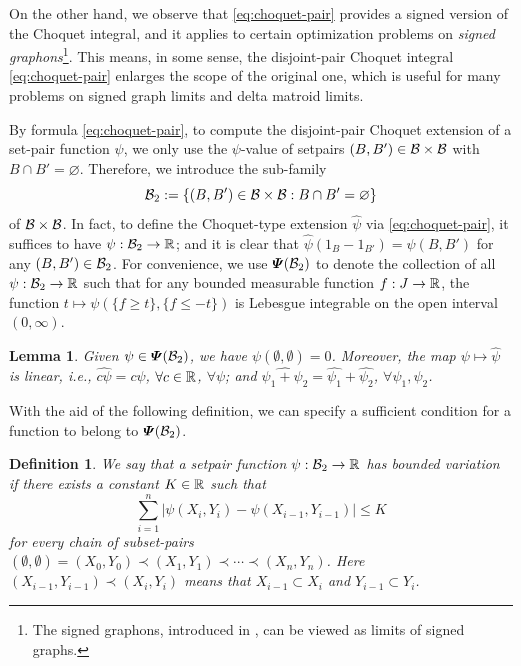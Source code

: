 \documentclass[12pt,a4paper]{article}
\newtheorem{lemma}[theorem]{Lemma}
\newtheorem{defn}[theorem]{Definition}
\begin{document}
On the other hand, we observe that \eqref{eq:choquet-pair} provides a signed version of the Choquet integral, and it applies to certain optimization problems on \emph{signed graphons}\footnote{The signed graphons, introduced in \cite{Lovasz-signed}, can be viewed as limits of signed graphs.}.  
This means, in some sense, the disjoint-pair Choquet integral  \eqref{eq:choquet-pair} enlarges the scope of the original one, which is useful for  
many problems on  signed graph limits and delta matroid limits. 

By formula \eqref{eq:choquet-pair}, to compute the disjoint-pair Choquet extension of a set-pair function $\psi$, we only use the $\psi$-value of setpairs $(B,B')\in \mathcal{B}\times \mathcal{B}$ with $B\cap B'=\varnothing$. Therefore, we introduce the sub-family $$\mathcal{B}_2:=\{(B,B')\in \mathcal{B}\times \mathcal{B}:B\cap B'=\varnothing\}$$ of $\mathcal{B}\times \mathcal{B}$. In fact, to define the Choquet-type extension $\widehat{\psi}$ via \eqref{eq:choquet-pair}, it suffices to have $\psi:\mathcal{B}_2\to\mathbb{R}$; and it is clear that $\widehat{\psi}(1_B-1_{B'})=\psi(B,B')$ for any $(B,B')\in\mathcal{B}_2$. For convenience, we use $\bm{\varPsi}(\mathcal{B}_2)$ to denote the collection of all $\psi:\mathcal{B}_2\to\mathbb{R}$ such that for any bounded measurable function $f:J\to\mathbb{R}$, the function $t\mapsto \psi(\{f\ge t\},\{f\le-t\})$ is Lebesgue integrable on the open interval $(0,\infty)$. 

\begin{lemma}
Given $\psi\in \bm{\varPsi}(\mathcal{B}_2)$, we have $\psi(\emptyset,\emptyset)=0$. Moreover, the map $\psi\mapsto \widehat{\psi}$ is linear, %
i.e., $\widehat{c\psi}=c\widehat{\psi}$, $\forall c\in\mathbb{R}$, $\forall \psi$;  and $\widehat{\psi_1+\psi_2}=\widehat{\psi_1}+\widehat{\psi_2}$, $\forall \psi_1,\psi_2$.
\end{lemma}
With the aid of the following definition, we can specify a sufficient condition for a function to belong to $\bm{\varPsi}(\mathcal{B}_2)$.
\begin{defn}
We say that a setpair function $\psi:\mathcal{B}_2\to\mathbb{R}$ has \emph{bounded variation} if there exists a constant $K\in\mathbb{R}$ such that 
$$\sum_{i=1}^n|\psi(X_i,Y_i)-\psi(X_{i-1},Y_{i-1})|\le K$$
for every chain of subset-pairs $(\emptyset,\emptyset)=(X_0,Y_0)\prec (X_1,Y_1)\prec\cdots\prec (X_n,Y_n)$. Here $(X_{i-1},Y_{i-1})\prec (X_i,Y_i)$ means that $X_{i-1}\subset X_i$ and $Y_{i-1}\subset Y_i$. 
\end{defn}
\end{document}
